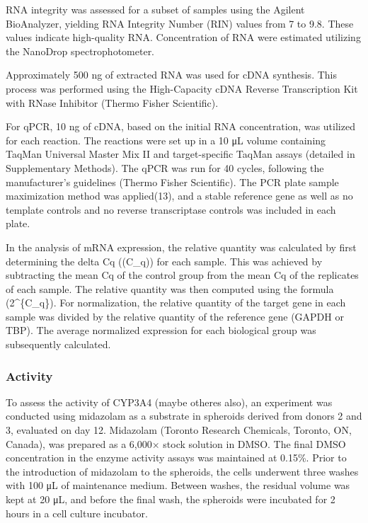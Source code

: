 \documentclass[
  letterpaper,
  DIV=11,
  numbers=noendperiod,
  oneside]{scrartcl}
\begin{document}
RNA integrity was assessed for a subset of samples
using the Agilent BioAnalyzer, yielding RNA Integrity Number (RIN)
values from 7 to 9.8. These values indicate high-quality RNA.
Concentration of RNA were estimated utilizing the NanoDrop
spectrophotometer.

Approximately 500 ng of extracted RNA was used for cDNA synthesis. This
process was performed using the High-Capacity cDNA Reverse Transcription
Kit with RNase Inhibitor (Thermo Fisher Scientific).

For qPCR, 10 ng of cDNA, based on the initial RNA concentration, was
utilized for each reaction. The reactions were set up in a 10 μL volume
containing TaqMan Universal Master Mix II and target-specific TaqMan
assays (detailed in Supplementary Methods). The qPCR was run for 40
cycles, following the manufacturer's guidelines (Thermo Fisher
Scientific). The PCR plate sample maximization method was applied(13),
and a stable reference gene as well as no template controls and no
reverse transcriptase controls was included in each plate.

In the analysis of mRNA expression, the relative quantity was calculated
by first determining the delta Cq ((\Delta C\_q)) for each sample. This
was achieved by subtracting the mean Cq of the control group from the
mean Cq of the replicates of each sample. The relative quantity was then
computed using the formula (2\^{}\{\Delta C\_q\}). For normalization,
the relative quantity of the target gene in each sample was divided by
the relative quantity of the reference gene (GAPDH or TBP). The average
normalized expression for each biological group was subsequently
calculated.

\subsubsection{Activity}\label{activity}

To assess the activity of CYP3A4 (maybe otheres also), an experiment was
conducted using midazolam as a substrate in spheroids derived from
donors 2 and 3, evaluated on day 12. Midazolam (Toronto Research
Chemicals, Toronto, ON, Canada), was prepared as a 6,000× stock solution
in DMSO. The final DMSO concentration in the enzyme activity assays was
maintained at 0.15\%. Prior to the introduction of midazolam to the
spheroids, the cells underwent three washes with 100 μL of maintenance
medium. Between washes, the residual volume was kept at 20 μL, and
before the final wash, the spheroids were incubated for 2 hours in a
cell culture incubator.
\end{document}
